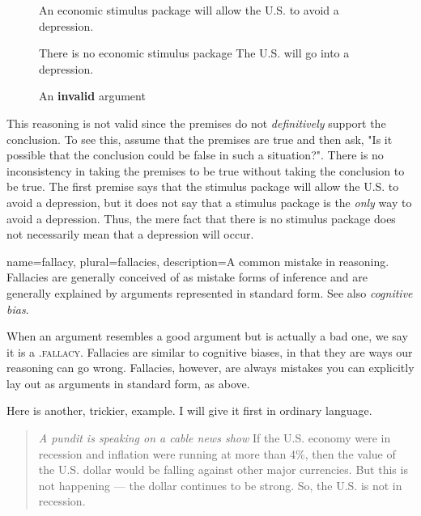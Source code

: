 \begin{figure}[b]
\begin{mdframed}[style=mytablebox]
\begin{earg*}
\item An economic stimulus package will allow the U.S. to avoid a depression. 
\item There is no economic stimulus package
\itemc[.3] The U.S. will go into a depression. 
\end{earg*}
\end{mdframed}
\caption{An \textbf{invalid} argument} \label{fig:invalid_stimulus}
\end{figure}


This reasoning is not valid since the premises do not \textit{definitively} support the conclusion. To see this, assume that the premises are true and then ask, "Is it possible that the conclusion could be false in such a situation?". There is no inconsistency in taking the premises to be true without taking the conclusion to be true. The first premise says that the stimulus package will allow the U.S. to avoid a depression, but it does not say that a stimulus package is the \textit{only }way to avoid a depression. Thus, the mere fact that there is no stimulus package does not necessarily mean that a depression will occur. 

{
name=fallacy,
plural=fallacies,
description={A common mistake in reasoning. Fallacies are generally conceived of as mistake forms of inference and are generally explained by arguments represented in standard form. See also \emph{cognitive bias}.}
}

When an argument resembles a good argument but is actually a bad one, we say it is a .\textsc{\gls{fallacy}}\label{def:fallacy}. Fallacies are similar to cognitive biases, in that they are ways our reasoning can go wrong.  Fallacies, however, are always mistakes you can explicitly lay out as arguments in standard form, as above. 

Here is another, trickier, example. I will give it first in ordinary language. 

\begin{quotation} \noindent\textit{A pundit is speaking on a cable news show} If the U.S. economy were in recession and inflation were running at more than 4\%, then the value of the U.S. dollar would be falling against other major currencies. But this is not happening --- the dollar continues to be strong. So, the U.S. is not in recession. \end{quotation}

